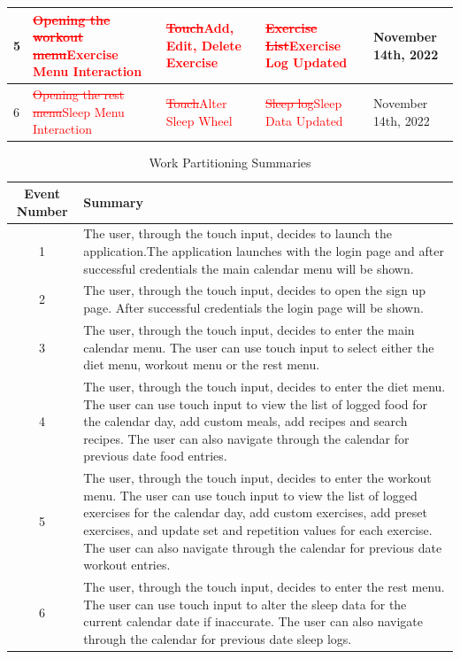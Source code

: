 \documentclass[12pt,letterpaper]{article}
\begin{document}
\begin{table}[h!]
\begin{tabularx}{\columnwidth}{|X|X|X|X|X|}
		\hline
		5 & \textcolor{red}{\sout{Opening the workout menu}}\newline \textcolor{red}{Exercise Menu Interaction} & \textcolor{red}{\sout{Touch}}\newline \textcolor{red}{Add, Edit, Delete Exercise} & \textcolor{red}{\sout{Exercise List}}\newline \textcolor{red}{Exercise Log Updated} & November 14th, 2022\\
		\hline
		6 & \textcolor{red}{\sout{Opening the rest menu}}\newline \textcolor{red}{Sleep Menu Interaction} & \textcolor{red}{\sout{Touch}}\newline \textcolor{red}{Alter Sleep Wheel} & \textcolor{red}{\sout{Sleep log}}\newline \textcolor{red}{Sleep Data Updated} &  November 14th, 2022\\
		\hline
	\end{tabularx}
\end{table}

\begin{table}[h!]
	\caption{Work Partitioning Summaries}
	\centering
	\begin{tabular}{|c|p{10cm}|}
		\hline
		\textbf{Event Number} & \textbf{Summary} \\
		\hline
		1 & The user, through the touch input, decides to launch the application.The application launches with the login page and after successful credentials the main calendar menu will be shown. \\
		\hline
		2 & The user, through the touch input, decides to open the sign up page. After successful credentials the login page will be shown. \\
		\hline
		3 & The user, through the touch input, decides to enter the main calendar menu. The user can use touch input to select either the diet menu, workout menu or the rest menu. \\
		\hline
		4 & The user, through the touch input, decides to enter the diet menu. The user can use touch input to view the list of logged food for the calendar day, add custom meals, add recipes and search recipes. The user can also navigate through the calendar for previous date food entries. \\
		\hline
		5 & The user, through the touch input, decides to enter the workout menu. The user can use touch input to view the list of logged exercises for the calendar day, add custom exercises, add preset exercises, and update set and repetition values for each exercise. The user can also navigate through the calendar for previous date workout entries. \\
		\hline
		6 & The user, through the touch input, decides to enter the rest menu. The user can use touch input to alter the sleep data for the current calendar date if inaccurate. The user can also navigate through the calendar for previous date sleep logs. \\
		\hline
	\end{tabular}
\end{table}
\end{document}
